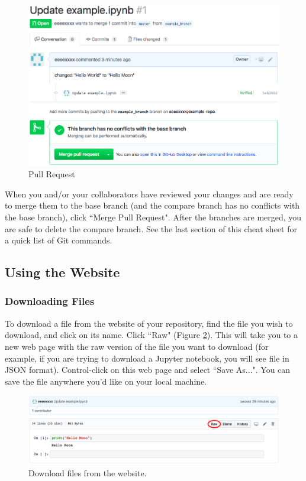 \documentclass[11pt,a4paper]{article}
\begin{document}
\begin{figure}[h!]
\centering
\includegraphics[width=.7\textwidth]{figures/open_pull_request2.png}
\caption{Pull Request}
\label{fig:open-pull-request2}
\end{figure}

When you and/or your collaborators have reviewed your changes and are ready to merge them to the base branch (and the compare branch has no conflicts with the base branch), click ``Merge Pull Request".
After the branches are merged, you are safe to delete the compare branch.
See the last section of this cheat sheet for a quick list of Git commands.

\subsection*{Using the Website}
\subsubsection*{Downloading Files}
To download a file from the website of your repository, find the file you wish to download, and click on its name.
Click ``Raw" (Figure \ref{fig:download}).
This will take you to a new web page with the raw version of the file you want to download (for example, if you are trying to download a Jupyter notebook, you will see file in JSON format).
Control-click on this web page and select ``Save As...".
You can save the file anywhere you'd like on your local machine.

\begin{figure}[h!]
\centering
\includegraphics[width=.7\textwidth]{figures/download.png}
\caption{Download files from the website.}
\label{fig:download}
\end{figure}
\end{document}
